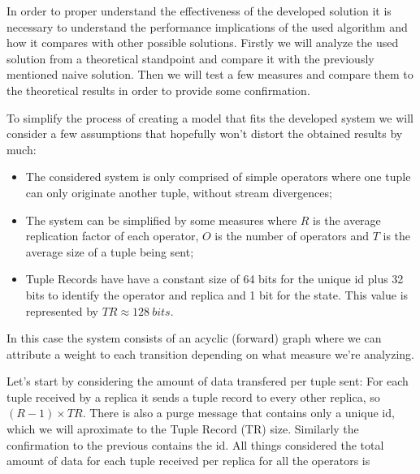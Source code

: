 \documentclass[times, 10pt,twocolumn]{article}
\begin{document}

In order to proper understand the effectiveness of the developed solution
it is necessary to understand the performance implications of the used
algorithm and how it compares with other possible solutions. Firstly we
will analyze the used solution from a theoretical standpoint and compare
it with the previously mentioned naive solution. Then we will test a few
measures and compare them to the theoretical results in order to provide
some confirmation.


To simplify the process of creating a model that fits the developed system
we will consider a few assumptions that hopefully won't distort the
obtained results by much: \begin{itemize} \item The considered system is
			only comprised of simple operators where one tuple can only
		originate another tuple, without stream divergences; \item The system
			can be simplified by some measures where $R$ is the average
			replication factor of each operator, $O$ is the number of operators
		and $T$ is the average size of a tuple being sent; \item Tuple Records
			have have a constant size of 64 bits for the unique id plus 32 bits
			to identify the operator and replica and 1 bit for the state.  This
			value is represented by $TR \approx 128\ bits$.  \end{itemize} In
	this case the system consists of an acyclic (forward) graph where we can
	attribute a weight to each transition depending on what measure we're
	analyzing.

Let's start by considering the amount of data transfered per tuple sent:
For each tuple received by a replica it sends a tuple record to every
other replica, so $(R-1)\times TR$. There is also a purge message that
contains only a unique id, which we will aproximate to the Tuple Record
(TR) size. Similarly the confirmation to the previous contains the id. All
things considered the total amount of data for each tuple received per
replica for all the operators is 

\end{document}

